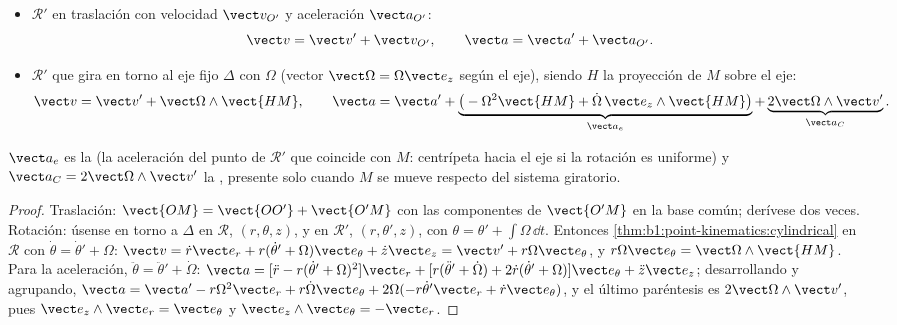 \begin{theorem}\label{thm:b1:non-inertial-frames:composition}
\begin{itemize}
  \item $\mathcal R'$ en traslación con velocidad $\vect v_{O'}$ y
        aceleración $\vect a_{O'}$:
        \[
        \vect v = \vect v' + \vect v_{O'}, \qquad \vect a = \vect a' + \vect a_{O'} .
        \]
  \item $\mathcal R'$ que gira en torno al eje fijo $\Delta$ con $\Omega$
        (vector $\vect\Omega = \Omega\vect e_z$ según el eje), siendo $H$ la
        proyección de $M$ sobre el eje:
        \[
        \vect v = \vect v' + \vect\Omega\wedge\vect{HM}, \qquad
        \vect a = \vect a' + \underbrace{\big(-\Omega^2\vect{HM} + \dot\Omega\,\vect e_z\wedge\vect{HM}\big)}_{\vect a_e}
        + \underbrace{2\vect\Omega\wedge\vect v'}_{\vect a_C} .
        \]
\end{itemize}
$\vect a_e$ es la \emph{} (la aceleración del punto
de $\mathcal R'$ que coincide con $M$: centrípeta hacia el eje si la
rotación es uniforme) y $\vect a_C = 2\vect\Omega\wedge\vect v'$ la
\emph{}, presente solo cuando $M$ se mueve respecto
del sistema giratorio.
\end{theorem}

\begin{proof}
Traslación: $\vect{OM} = \vect{OO'} + \vect{O'M}$ con las componentes de
$\vect{O'M}$ en la base común; derívese dos veces. Rotación: úsense
 en torno a $\Delta$ en $\mathcal R$, $(r, \theta, z)$,
y en $\mathcal R'$, $(r, \theta', z)$, con $\theta = \theta' + \int\Omega\,\dd t$.
Entonces \cref{thm:b1:point-kinematics:cylindrical} en $\mathcal R$ con
$\dot\theta = \dot\theta' + \Omega$:
$\vect v = \dot r\vect e_r + r(\dot\theta' + \Omega)\vect e_\theta + \dot z\vect e_z
= \vect v' + r\Omega\vect e_\theta$, y $r\Omega\vect e_\theta = \vect\Omega\wedge\vect{HM}$.
Para la aceleración, $\ddot\theta = \ddot\theta' + \dot\Omega$:
$\vect a = [\ddot r - r(\dot\theta' + \Omega)^2]\vect e_r + [r(\ddot\theta' + \dot\Omega)
+ 2\dot r(\dot\theta' + \Omega)]\vect e_\theta + \ddot z\vect e_z$; desarrollando
y agrupando, $\vect a = \vect a' - r\Omega^2\vect e_r + r\dot\Omega\vect e_\theta
+ 2\Omega(-r\dot\theta'\vect e_r + \dot r\vect e_\theta)$, y el último paréntesis
es $2\vect\Omega\wedge\vect v'$, pues $\vect e_z\wedge\vect e_r = \vect e_\theta$ y
$\vect e_z\wedge\vect e_\theta = -\vect e_r$.
\end{proof}

